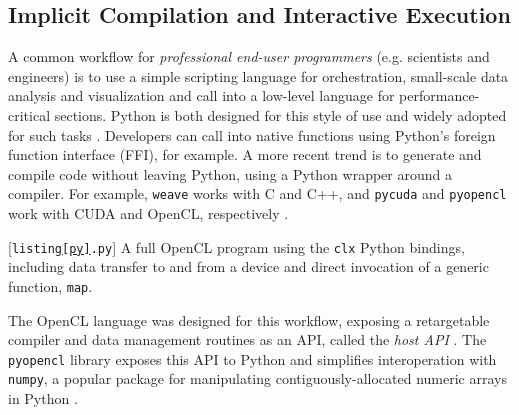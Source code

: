 \documentclass[9pt,preprint]{sigplanconf}
\begin{document}
\subsection{Implicit Compilation and Interactive Execution}\label{compenv}\label{backend}\label{implicit}


A common workflow for \emph{professional end-user programmers} (e.g. scientists and engineers) is to use a simple scripting language for orchestration, small-scale data analysis and visualization and call into a low-level language for performance-critical sections. Python is both designed for this style of use and widely adopted for such tasks \cite{sanner1999python,nguyen2010survey}. Developers can call into native functions using Python's foreign function interface (FFI), for example. A more recent trend is to generate and compile code without leaving Python, using a Python wrapper around a compiler. For example, \verb|weave| works with C and C++, and \verb|pycuda| and \verb|pyopencl| work with CUDA and OpenCL, respectively \cite{klockner2011pycuda}. 
\begin{codelisting}

\caption{[\texttt{listing\ref{py}.py}] A full OpenCL program using the \texttt{clx} Python bindings, including data transfer to and from a device and direct invocation of a generic function, \texttt{map}.}
\label{py}
\end{codelisting}
The OpenCL language was designed for this workflow, exposing a retargetable compiler and data management  routines as an API, called the \emph{host API} \cite{opencl11}. The \verb|pyopencl| library exposes this API to Python and simplifies interoperation with \verb|numpy|, a popular package for manipulating contiguously-allocated numeric arrays in Python \cite{klockner2011pycuda}.
\end{document}
